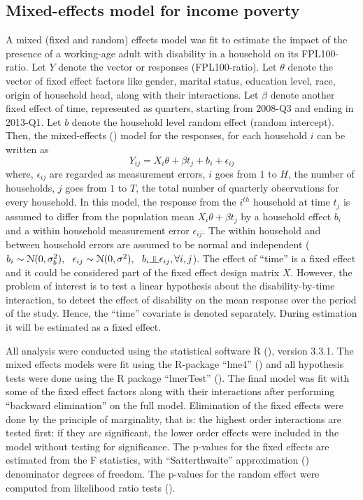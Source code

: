 \documentclass[11pt]{extarticle} %
\begin{document}
\subsection{Mixed-effects model for income poverty}
A mixed (fixed and random) effects model was fit to estimate the impact of the presence of a working-age adult with disability in a household on its FPL100-ratio. Let $Y$ denote the vector or responses (FPL100-ratio). Let $\theta$ denote the vector of fixed effect factors like gender, marital status, education level, race, origin of household head, along with their interactions. Let $\beta$ denote another fixed effect of time, represented as quarters, starting from 2008-Q3 and ending in 2013-Q1. Let $b$ denote the household level random effect (random intercept). Then, the mixed-effects (\cite{Fitzmaurice_2012_Applied}) model for the responses, for each household $i$ can be written as
\begin{equation}
Y_{ij} = X_i\theta + \beta t_j + b_i + \epsilon_{ij}
\label{eq:MixedEffects1}
\end{equation}
where, $\epsilon_{ij}$ are regarded as measurement errors, $i$ goes from $1$ to $H$, the number of households, $j$ goes from $1$ to $T$, the total number of quarterly observations for every household. In this model, the response from the $i^{th}$ household at time $t_j$ is assumed to differ from the population mean $X_i\theta + \beta t_j$ by a household effect $b_i$ and a within household measurement error $\epsilon_{ij}$. The within household and between household errors are assumed to be normal and independent ($b_i \sim \N(0, \sigma^2_b),\ \ \epsilon_{ij} \sim \N(0, \sigma^2), \ \ b_i \indep \epsilon_{ij}, \forall i, j$). The effect of ``time'' is a fixed effect and it could be considered part of the fixed effect design matrix $X$. However, the problem of interest is to test a linear hypothesis about the disability-by-time interaction, to detect the effect of disability on the mean response over the period of the study. Hence, the ``time'' covariate is denoted separately. During estimation it will be estimated as a fixed effect. 

All analysis were conducted using the statistical software R (\cite{R}), version 3.3.1. The mixed effects models were fit using the R-package ``lme4'' (\cite{R-lme4}) and all hypothesis tests were done using the R package ``lmerTest'' (\cite{Kuznetsova_etal_2015_R-lmerTest}). The final model was fit with some of the fixed effect factors along with their interactions after performing ``backward elimination'' on the full model. Elimination of the fixed effects were done by the principle of marginality, that is: the highest order interactions are tested first: if they are significant, the lower order effects were included in the model without testing for significance. The p-values for the fixed effects are estimated from the F statistics, with ``Satterthwaite'' approximation (\cite{Satterthwaite_1946_Biometrics}) denominator degrees of freedom. The p-values for the random effect were computed from likelihood ratio tests (\cite{Morrell_1998_Biometrics}). 
\end{document}
